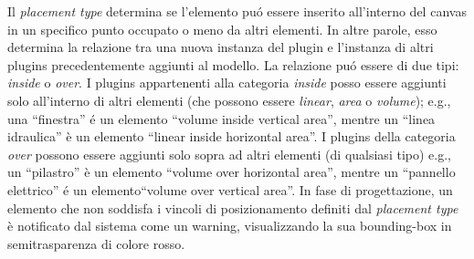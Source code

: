Il \emph{placement type} determina se l'elemento pu\'o essere inserito all'interno del canvas in un specifico punto occupato o meno
da altri elementi. In altre parole, esso determina la relazione tra una nuova instanza del plugin e l'instanza di altri
plugins precedentemente aggiunti al modello. La relazione pu\'o essere di due tipi: \emph{inside} o \emph{over}.
I plugins appartenenti alla categoria \emph{inside} posso essere aggiunti solo all'interno di altri elementi (che possono essere
\emph{linear}, \emph{area} o \emph{volume}); e.g., una ``finestra'' \'e un elemento ``volume inside vertical area'',
mentre un ``linea idraulica'' \`e un elemento ``linear inside horizontal area''.
I plugins della categoria \emph{over} possono essere aggiunti solo sopra ad altri elementi (di qualsiasi tipo)
e.g., un ``pilastro'' \`e un elemento ``volume over horizontal area'',
mentre un ``pannello elettrico'' \'e un elemento``volume over vertical area''.
In fase di progettazione, un elemento che non soddisfa i vincoli di posizionamento definiti dal \emph{placement type} \`e
notificato dal sistema come un warning, visualizzando la sua bounding-box in semitrasparenza di colore rosso.
\newpage
